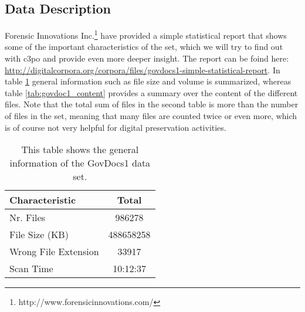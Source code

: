 \subsection{Data Description}
Forensic Innovations Inc.\footnote{http://www.forensicinnovations.com/} have provided a simple statistical report that shows some of the important characteristics of the set, which we will try to find out with c3po and provide even more deeper insight. The report can be foind here: \url{http://digitalcorpora.org/corpora/files/govdocs1-simple-statistical-report}. In table \ref{tab:govdoc1_general_info} general information such as file size and volume is summarized, whereas table \ref{tab:govdoc1_content} provides a summary over the content of the different files. Note that the total sum of files in the second table is more than the number of files in the set, meaning that many files are counted twice or even more, which is of course not very helpful for digital preservation activities.

\begin{table}
\centering
\begin{tabular}{l || c }
\hline
Characteristic & Total \\
\hline
\hline
Nr. Files & 986278 \\
File Size (KB) & 488658258 \\
Wrong File Extension & 33917 \\
Scan Time & 10:12:37 \\
\hline
\end{tabular}
\caption{This table shows the general information of the GovDocs1 data set.}
\label{tab:govdoc1_general_info}
\end{table}

